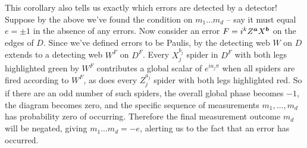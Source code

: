This corollary also tells us exactly which errors are detected by a detector!
Suppose by the above we've found the condition on $m_1 \ldots m_d$ -- say it must equal $e = \pm 1$ in the absence of any errors.
Now consider an error $F = i^k Z^{\boldsymbol{a}}X^{\boldsymbol{b}}$ on the edges of $D$.
Since we've defined errors to be Paulis, by  the detecting web $W$ on $D$ extends to a detecting web $W^F$ on $D^F$.
Every $X_j^{b_j}$ spider in $D^F$ with both legs highlighted green by $W^F$ contributes a global scalar of $e^{ia_j\pi}$ when all spiders are fired according to $W^F$, as does every $Z_j^{a_j}$ spider with both legs highlighted red.
So if there are an odd number of such spiders, the overall global phase becomes $-1$, the diagram becomes zero, and the specific sequence of measurements $m_1, \ldots, m_d$ has probability zero of occurring.
Therefore the final measurement outcome $m_d$ will be negated, giving $m_1 \ldots m_d = -e$, alerting us to the fact that an error has occurred.

